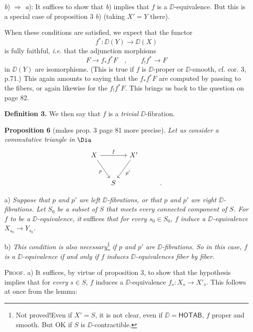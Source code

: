 \textit{b}) $\Rightarrow$ \textit{a}): It suffices to show that \textit{b}) implies that $f$ is a $\DD$-equivalence. But this is a special case of proposition 3 \textit{b}) (taking $X' = Y$ there).


When these conditions are satisfied, we expect that the functor
\[
f^* : \DD(Y) \longrightarrow \DD(X)
\]
is fully faithful, \textit{i.e.} that the adjunction morphisms %
\[
F \longrightarrow f_*f^*F \quad , \qquad f_!f^* \longrightarrow F %
\]
in $\DD(Y)$ are isomorphisms. (This is true if $f$ is $\DD$-proper or $\DD$-smooth, cf. cor. 3, p.71.) This again amounts to saying that the $f_*f^*F$ are computed by passing to the fibers, or again likewise for the $f_!f^*F$. This brings us back to the question on page 82.

\textbf{Definition 3.} We then say that $f$ is a \textit{trivial} $\DD$-fibration.

\textbf{Proposition 6} (makes prop. 3 page 81 more precise). \textit{Let us consider a commutative triangle in} $\Dia$
\[
\begin{tikzcd}[column sep=small, row sep=large]
X \arrow[rr, "f"] \arrow[dr, "p"'] & & X' \arrow[dl, "p'"] \\
& S & & & .
\end{tikzcd}
\]


\indent a) \textit{Suppose that $p$ and $p'$ are left $\DD$-fibrations, or that $p$ and $p'$ are right $\DD$-fibrations. Let $S_0$ be a subset of $S$ that meets every connected component of $S$. For $f$ to be a $\DD$-equivalence, it} suffices \textit{that for every $s_0 \in S_0$, $f$ induce a $\DD$-equivalence $X_{s_0} \to Y_{s_0}$.}

\indent b) \textit{This condition is also necessary}\footnote[40]{Not proved!\footnotemark[41] Even if $X' = S$, it is not clear, even if $\DD = \mathsf{HOTAB}$, $f$ proper and smooth. But OK if $S$ is $\DD$-contractible.} \textit{if $p$ and $p'$ are $\DD$-fibrations. So in this case, $f$ is a $\DD$-equivalence if and only if $f$ induces $\DD$-equivalences fiber by fiber.}


\textsc{Proof.} a) It suffices, by virtue of proposition 3, to show that the hypothesis implies that for \textit{every} $s \in S$, $f$ induces a $\DD$-equivalence $f_s : X_s \to X'_s$. This follows at once from the lemma:

